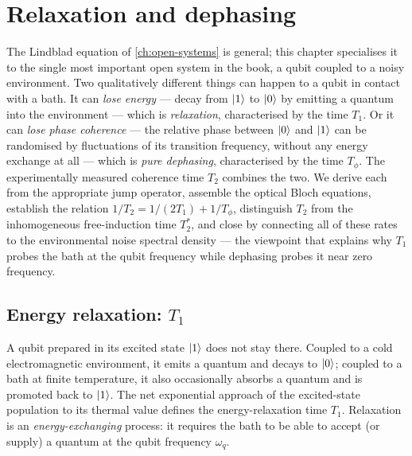 \chapter{Relaxation and dephasing}
\label{ch:relaxation-dephasing}

The Lindblad equation of \cref{ch:open-systems} is general; this
chapter specialises it to the single most important open system in
the book, a qubit coupled to a noisy environment. Two qualitatively
different things can happen to a qubit in contact with a bath. It
can \emph{lose energy} --- decay from $\ket1$ to $\ket0$ by emitting
a quantum into the environment --- which is \emph{relaxation},
characterised by the time $T_1$. Or it can \emph{lose phase
coherence} --- the relative phase between $\ket0$ and $\ket1$ can be
randomised by fluctuations of its transition frequency, without any
energy exchange at all --- which is \emph{pure dephasing},
characterised by the time $T_\phi$. The experimentally measured
coherence time $T_2$ combines the two. We derive each from the
appropriate jump operator, assemble the optical Bloch equations,
establish the relation $1/T_2 = 1/(2T_1)+1/T_\phi$, distinguish
$T_2$ from the inhomogeneous free-induction time $T_2^*$, and close
by connecting all of these rates to the environmental noise
spectral density --- the viewpoint that explains why $T_1$ probes
the bath at the qubit frequency while dephasing probes it near zero
frequency.

\section{Energy relaxation: \texorpdfstring{$T_1$}{T1}}
\label{sec:relaxation}

\begin{phenomenon}
A qubit prepared in its excited state $\ket1$ does not stay there.
Coupled to a cold electromagnetic environment, it emits a quantum
and decays to $\ket0$; coupled to a bath at finite temperature, it
also occasionally absorbs a quantum and is promoted back to $\ket1$.
The net exponential approach of the excited-state population to its
thermal value defines the energy-relaxation time $T_1$. Relaxation
is an \emph{energy-exchanging} process: it requires the bath to be
able to accept (or supply) a quantum at the qubit frequency
$\omega_q$.
\end{phenomenon}

